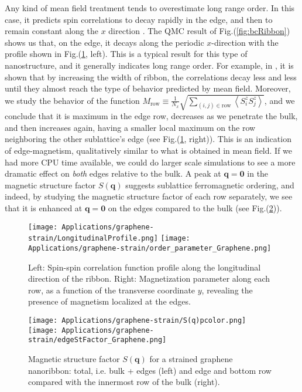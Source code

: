Any kind of mean field treatment tends to overestimate long range order.
In this case, it predicts spin correlations to decay rapidly in the edge, and then to remain constant along the $x$ direction \cite{feldner_dynamical_2011}.
The \ac{QMC} result of Fig.(\ref{fig:bcRibbon}) shows us that, on the edge, it decays along the periodic $x$-direction with the profile shown in Fig.(\ref{fig:longProf}, left).
This is a typical result for this type of nanostructure, and it generally indicates long range order.
For example, in \cite{feldner_dynamical_2011}, it is shown that by increasing the width of ribbon, the correlations decay less and less until they almost reach the type of behavior predicted by mean field.
Moreover, we study the behavior of the function $M_{\text{row}} \equiv \frac{1}{N_x}\sqrt{ \sum_{(i, j) \in \text{row}} \left\langle S_i^z S_j^z \right\rangle}$, and we conclude that it is maximum in the edge row, decreases as we penetrate the bulk, and then increases again, having a smaller local maximum on the row neighboring the other sublattice's edge (see Fig.(\ref{fig:longProf}, right)).
This is an indication of edge-magnetism, qualitatively similar to what is obtained in mean field.
If we had more CPU time available, we could do larger scale simulations to see a more dramatic effect on \emph{both} edges relative to the bulk.
A peak at $\bm q = \bm 0$ in the magnetic structure factor $S ( \bm q )$ suggests sublattice ferromagnetic ordering, and indeed, by studying the magnetic structure factor of each row separately, we see that it is enhanced at $\bm q = \bm 0$ on the edges compared to the bulk (see Fig.(\ref{fig:edgeStFactor})).

\begin{figure}[H]
\texttt{[image: Applications/graphene-strain/LongitudinalProfile.png]}
\texttt{[image: Applications/graphene-strain/order\_parameter\_Graphene.png]}
	\caption[Spin-spin correlation function profile along the longitudinal direction $x$ of the ribbon. Magnetization parameter along each row, as a function of the transverse coordinate $y$.
	]{Left: Spin-spin correlation function profile along the longitudinal direction of the ribbon. Right: Magnetization parameter along each row, as a function of the transverse coordinate $y$, revealing the presence of magnetism localized at the edges.}
	\label{fig:longProf}
\end{figure}
\vspace{-1.3cm}
\begin{figure}[H]
\hspace{0.3cm}
\texttt{[image: Applications/graphene-strain/S(q)pcolor.png]}
\texttt{[image: Applications/graphene-strain/edgeStFactor\_Graphene.png]}
	\caption[Magnetic structure factor $S(\bm q)$ for a strained graphene nanoribbon: bulk and edges.]{Magnetic structure factor $S(\bm q)$ for a strained graphene nanoribbon: total, i.e. bulk + edges (left) and edge and bottom row compared with the innermost row of the bulk (right).}
	\label{fig:edgeStFactor}
\end{figure}

